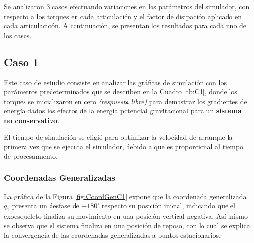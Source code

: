 \noindent Se analizaron 3 casos efectuando variaciones en los parámetros del 
simulador, con respecto a los torques en cada articulación y el factor 
de disipación aplicado en cada articulacioón. A continuación, se 
presentan los resultados para cada uno de los casos.

\subsection{Caso 1}\label{caso1}
    \noindent Este caso de estudio consiste en analizar las gráficas de simulación con los 
    parámetros  predeterminados que se describen en la Cuadro \ref{tb:C1}, donde  
    los torques se inicializaron en cero \emph{(respuesta libre)} para demostrar los gradientes de energía
    dados los efectos de la energía potencial gravitacional para un \textbf{sistema no conservativo}. 
    \begin{table}[H]
        \centering
        \begin{center}
            \caption{Parámetros originales del simulador} 
            \centering
            \end{center}
            \label{tb:C1}
        \end{table}
        
    El tiempo de simulación se eligió para optimizar la velocidad de arranque la 
    primera vez que se ejecuta el simulador, debido a que es proporcional al tiempo 
    de procesamiento.

    \subsubsection{Coordenadas Generalizadas}
    \noindent La gráfica de la Figura \ref{fig:CoordGenC1} expone que la coordenada generalizada
    $q_1$ presenta un desfase de $-180^{\circ}$ respecto su posición inicial, indicando que el
    exoesqueleto finaliza su movimiento en una posición vertical negativa. Así mismo se
    observa que el sistema finaliza en una posición de reposo, con lo cual se explica la
    convergencia de las coordenadas generalizadas a puntos estacionarios.

